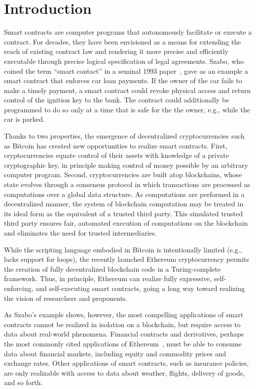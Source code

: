 \section{Introduction}

Smart contracts are computer programs that autonomously facilitate or execute a contract. For decades, they have been envisioned as a means for extending the reach of existing contract law and rendering it more precise and efficiently executable through precise logical specification of legal agreements. Szabo, who coined the term ``smart contact'' in a seminal 1993 paper~\cite{}, gave as an example a smart contract that enforces car loan payments. If the owner of the car fails to make a timely payment, a smart contract could revoke physical access and return control of the ignition key to the bank. The contract could additionally be programmed to do so only at a time that is safe for the the owner, e.g., while the car is parked.

Thanks to two properties, the emergence of decentralized cryptocurrencies such as Bitcoin has created new opportunities to realize smart contracts. First, cryptocurrencies equate control of their assets with knowledge of a private cryptographic key, in principle making control of money possible by an arbitrary computer program. Second, cryptocurrencies are built atop blockchains, whose state evolves through a consensus protocol in which transactions are processed as computations over a global data structure. As computations are performed in a decentralized manner, the system of blockchain computation may be treated in its ideal form as the equivalent of a trusted third party. This simulated trusted third party ensures fair, automated execution of computations on the blockchain and eliminates the need for trusted intermediaries. 

While the scripting language embodied in Bitcoin is intentionally limited (e.g., lacks support for loops), the recently launched Ethereum cryptocurrency permits the creation of fully decentralized blockchain code in a Turing-complete framework. Thus, in principle, Ethereum can realize fully expressive, self-enforcing, and self-executing smart contracts, going a long way toward realizing the vision of researchers and proponents.  

As Szabo's example shows, however, the most compelling applications of smart contracts cannot be realized in isolation on a blockchain, but require access to data about real-world phenomena. Financial contracts and derivatives, perhaps the most commonly cited applications of Ethereum~\cite{}, must be able to consume data about financial markets, including equity and commodity prices and exchange rates. Other applications of smart contracts, such as insurance policies, are only realizable with access to data about weather, flights, delivery of goods, and so forth. 

